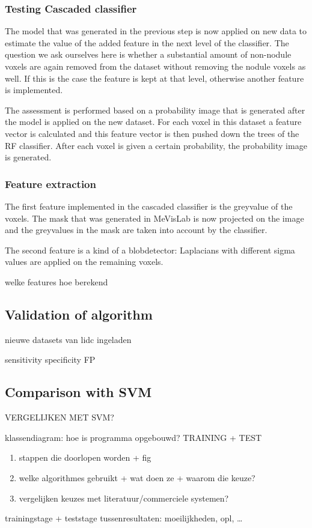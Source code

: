 
\subsubsection{Testing Cascaded classifier}
The model that was generated in the previous step is now applied on new data to
estimate the value of the added feature in the next level of the classifier.
The question we ask ourselves here is whether a substantial amount of
non-nodule voxels are again removed from the dataset without removing the nodule
voxels as well. If this is the case the feature is kept at that level, otherwise
another feature is implemented.

The assessment is performed based on a probability image that is generated after
the model is applied on the new dataset. For each voxel in this dataset a
feature vector is calculated and this feature vector is then pushed down the
trees of the RF classifier. After each voxel is given a certain probability, the
probability image is generated.


\subsubsection{Feature extraction} \label{sec:featureExtraction}
The first feature implemented in the cascaded classifier is the greyvalue of the
voxels. The mask that was generated in MeVisLab is now projected on the image
and the greyvalues in the mask are taken into account by the classifier.

The second feature is a kind of a blobdetector: Laplacians with different sigma
values are applied on the remaining voxels. %






welke features
hoe berekend

\subsection{Validation of algorithm}
nieuwe datasets van lidc ingeladen

sensitivity
specificity
FP


\subsection{Comparison with SVM}

VERGELIJKEN MET SVM?






klassendiagram: hoe is programma opgebouwd?
TRAINING + TEST
\begin{enumerate}
\item stappen die doorlopen worden + fig
\item welke algorithmes gebruikt + wat doen ze + waarom die keuze?
\item vergelijken keuzes met literatuur/commerciele systemen?
\end{enumerate}


trainingstage + teststage
tussenresultaten: moeilijkheden, opl, \ldots


